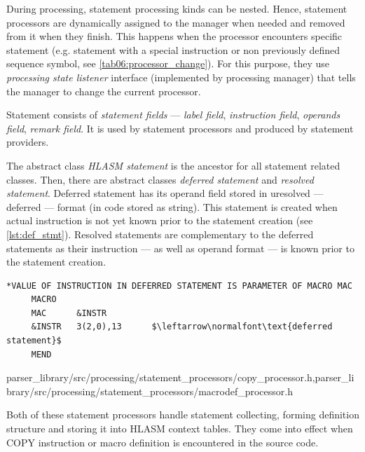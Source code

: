 During processing, statement processing kinds can be nested. Hence, statement processors are dynamically assigned to the manager when needed and removed from it when they finish. This happens when the processor encounters specific statement (e.g. statement with a special instruction or non previously defined sequence symbol, see \cref{tab06:processor_change}). For this purpose, they use \emph{processing state listener} interface (implemented by processing manager) that tells the manager to change the current processor.

Statement consists of \emph{statement fields} --- \emph{label field}, \emph{instruction field}, \emph{operands field}, \emph{remark field}. It is used by statement processors and produced by statement providers. 

The abstract class \emph{HLASM statement} is the ancestor for all statement related classes. Then, there are abstract classes \emph{deferred statement} and \emph{resolved statement}. Deferred statement has its operand field stored in uresolved --- deferred --- format (in code stored as string). This statement is created when actual instruction is not yet known prior to the statement creation (see \cref{lst:def_stmt}). Resolved statements are complementary to the deferred statements as their instruction --- as well as operand format --- is known prior to the statement creation.

\begin{listing}[t]
	\begin{Verbatim}[commandchars=\\\{\},codes={\catcode`$=3}]
*VALUE OF INSTRUCTION IN DEFERRED STATEMENT IS PARAMETER OF MACRO MAC
     MACRO
     MAC      &INSTR
     &INSTR   3(2,0),13      $\leftarrow\normalfont\text{deferred statement}$
     MEND
	\end{Verbatim}
	\caption{An example of deferred statement in code.}
	\label{lst:def_stmt}
\end{listing}




{parser\_library/src/processing/statement\_processors/copy\_processor.h,parser\_library/src/processing/statement\_processors/macrodef\_processor.h}

Both of these statement processors handle statement collecting, forming definition structure and storing it into HLASM context tables. They come into effect when COPY instruction or macro definition is encountered in the source code. 

